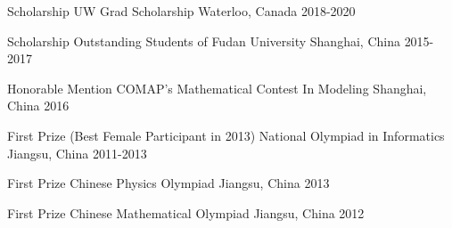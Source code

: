


\begin{cvhonors}


  \cvhonor
    {Scholarship} %
    {UW Grad Scholarship} %
    {Waterloo, Canada} %
    {2018-2020} %

\end{cvhonors}


\begin{cvhonors}

  \cvhonor
    {Scholarship} %
    {Outstanding Students of Fudan University} %
    {Shanghai, China} %
    {2015-2017} %

  \cvhonor
    {Honorable Mention} %
    {COMAP's Mathematical Contest In Modeling} %
    {Shanghai, China} %
    {2016} %

  \cvhonor
    {First Prize (Best Female Participant in 2013)} %
    {National Olympiad in Informatics} %
    {Jiangsu, China} %
    {2011-2013} %

  \cvhonor
    {First Prize} %
    {Chinese Physics Olympiad} %
    {Jiangsu, China} %
    {2013} %

  \cvhonor
    {First Prize} %
    {Chinese Mathematical Olympiad} %
    {Jiangsu, China} %
    {2012} %

\end{cvhonors}


